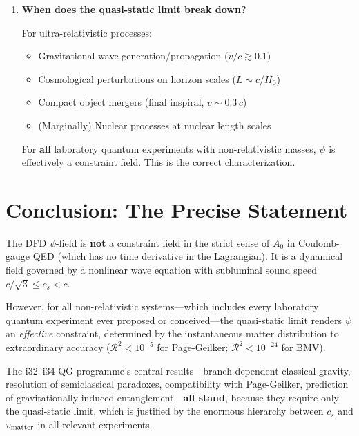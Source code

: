 \documentclass[12pt,a4paper]{article}
\begin{document}
\begin{enumerate}
Yes. The quasi-static ratio is $\mathcal{R} \sim 10^{-12}$, valid by
twelve orders of magnitude. The $\psi$-field is effectively an
instantaneous constraint for BMV.

\item \textbf{When does the quasi-static limit break down?}

For ultra-relativistic processes:
\begin{itemize}
\item Gravitational wave generation/propagation ($v/c \gtrsim 0.1$)
\item Cosmological perturbations on horizon scales ($L \sim c/H_0$)
\item Compact object mergers (final inspiral, $v \sim 0.3\,c$)
\item (Marginally) Nuclear processes at nuclear length scales
\end{itemize}

For \textbf{all} laboratory quantum experiments with non-relativistic
masses, $\psi$ is effectively a constraint field. This is the correct
characterization.
\end{enumerate}


\section{Conclusion: The Precise Statement}
\label{sec:conclusion}

The DFD $\psi$-field is \textbf{not} a constraint field in the strict sense
of $A_0$ in Coulomb-gauge QED (which has no time derivative in the
Lagrangian). It is a dynamical field governed by a nonlinear wave equation
with subluminal sound speed $c/\sqrt{3} \leq c_s < c$.

However, for all non-relativistic systems---which includes every laboratory
quantum experiment ever proposed or conceived---the quasi-static limit
renders $\psi$ an \emph{effective} constraint, determined by the
instantaneous matter distribution to extraordinary accuracy
($\mathcal{R}^2 < 10^{-5}$ for Page-Geilker; $\mathcal{R}^2 < 10^{-24}$
for BMV).

The i32--i34 QG programme's central results---branch-dependent classical
gravity, resolution of semiclassical paradoxes, compatibility with Page-Geilker,
prediction of gravitationally-induced entanglement---\textbf{all stand},
because they require only the quasi-static limit, which is justified by the
enormous hierarchy between $c_s$ and $v_{\rm matter}$ in all relevant
experiments.
\end{document}
